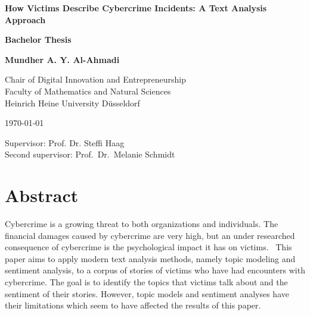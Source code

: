 \documentclass[12pt,english,titlepage,a4paper]{article}
\begin{document}
\begin{titlepage}
\begin{center}

\textbf{\LARGE How Victims Describe Cybercrime Incidents: A Text Analysis Approach}

\bigskip\bigskip
\textbf{Bachelor Thesis}

\bigskip
\textbf{Mundher A. Y. Al-Ahmadi}



\vfill
Chair of Digital Innovation and Entrepreneurship\\ 
Faculty of Mathematics and Natural Sciences \\ 
Heinrich Heine University D\"usseldorf

\bigskip
\today

\bigskip
Supervisor: Prof. Dr. Steffi Haag \\
Second supervisor: Prof.\ Dr.\ Melanie Schmidt

\end{center}
\end{titlepage}

\thispagestyle{empty}\mbox{}\pagebreak
\setcounter{page}{0}





\tableofcontents
\pagebreak

\section*{Abstract}
Cybercrime is a growing threat to both organizations and individuals. The financial damages caused by cybercrime are very high, but an under researched consequence of cybercrime is the psychological impact it has on victims.~\cite{horesearch} This paper aims to apply modern text analysis methods, namely topic modeling and sentiment analysis, to a corpus of stories of victims who have had encounters with cybercrime. The goal is to identify the topics that victims talk about and the sentiment of their stories. However, topic models and sentiment analyses have their limitations which seem to have affected the results of this paper.
\end{document}
